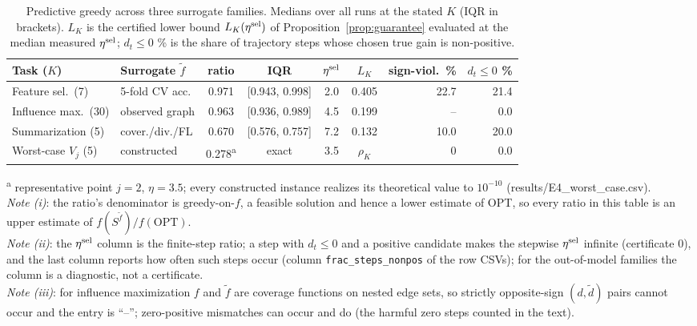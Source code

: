 \begin{table}[t]
\centering
\caption{Predictive greedy across three surrogate families. Medians over all
runs at the stated $K$ (IQR in brackets). $L_K$ is the certified lower bound
$L_K(\eta^{\mathrm{sel}})$ of Proposition~\ref{prop:guarantee} evaluated at the median
measured $\eta^{\mathrm{sel}}$; $d_t \le 0$ \% is the share of trajectory steps whose
chosen true gain is non-positive.}
\label{tab:experiments}
\small
\setlength{\tabcolsep}{4pt}
\begin{tabular}{llccccrr}
\toprule
Task ($K$) & Surrogate $\tilde f$ & ratio & IQR & $\eta^{\mathrm{sel}}$ & $L_K$ & sign-viol.\ \% & $d_t\!\le\!0$ \% \\
\midrule
Feature sel.\ (7) & 5-fold CV acc. & 0.971 & [0.943, 0.998] & 2.0 & 0.405 & 22.7 & 21.4 \\
Influence max.\ (30) & observed graph & 0.963 & [0.936, 0.989] & 4.5 & 0.199 & -- & 0.0 \\
Summarization (5) & cover./div./FL & 0.670 & [0.576, 0.757] & 7.2 & 0.132 & 10.0 & 20.0 \\
\midrule
Worst-case $V_j$ (5) & constructed & 0.278\textsuperscript{a} & exact & 3.5 & $\rho_K$ & 0 & 0.0 \\
\bottomrule
\end{tabular}
\vspace{2pt}
{\footnotesize \textsuperscript{a} representative point $j=2$, $\eta=3.5$;
every constructed instance realizes its theoretical value to $10^{-10}$
(results/E4\_worst\_case.csv).\\
\emph{Note (i)}: the ratio's denominator is greedy-on-$f$, a feasible
solution and hence a lower estimate of OPT, so every ratio in this table is
an upper estimate of $f(S^{\tilde f})/f(\mathrm{OPT})$.\\
\emph{Note (ii)}: the $\eta^{\mathrm{sel}}$ column is the finite-step ratio; a step
with $d_t \le 0$ and a positive candidate makes the stepwise $\eta^{\mathrm{sel}}$
infinite (certificate $0$), and the last column reports how often such
steps occur (column \texttt{frac\_steps\_nonpos} of the row CSVs); for the
out-of-model families the column is a diagnostic, not a certificate.\\
\emph{Note (iii)}: for influence maximization $f$ and $\tilde f$ are
coverage functions on nested edge sets, so strictly opposite-sign
$(d,\tilde d)$ pairs cannot occur and the entry is ``--''; zero-positive
mismatches can occur and do (the harmful zero steps counted in the text).}
\end{table}
